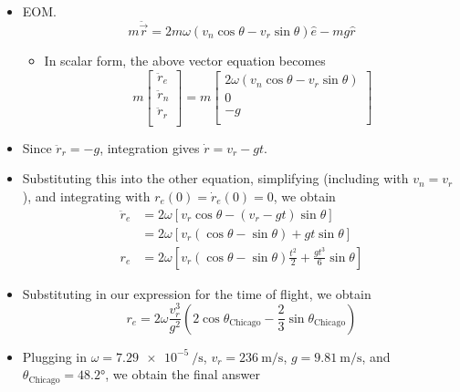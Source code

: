 \documentclass[../notes.tex]{subfiles}
\begin{document}
\begin{itemize}
\begin{itemize}
\begin{itemize}
        \end{itemize}
        \item EOM.
        \begin{equation*}
            m\ddot{\vec{r}} = 2m\omega(v_n\cos\theta-v_r\sin\theta)\hat{e}-mg\hat{r}
        \end{equation*}
        \begin{itemize}
            \item In scalar form, the above vector equation becomes
            \begin{equation*}
                m
                \begin{bmatrix}
                    \ddot{r}_e\\
                    \ddot{r}_n\\
                    \ddot{r}_r\\
                \end{bmatrix}
                = m
                \begin{bmatrix}
                    2\omega(v_n\cos\theta-v_r\sin\theta)\\
                    0\\
                    -g\\
                \end{bmatrix}
            \end{equation*}
        \end{itemize}
        \item Since $\ddot{r}_r=-g$, integration gives $\dot{r}=v_r-gt$.
        \item Substituting this into the other equation, simplifying (including with $v_n=v_r$), and integrating with $r_e(0)=\dot{r}_e(0)=0$, we obtain
        \begin{align*}
            \ddot{r}_e &= 2\omega[v_r\cos\theta-(v_r-gt)\sin\theta]\\
            &= 2\omega[v_r(\cos\theta-\sin\theta)+gt\sin\theta]\\
            r_e &= 2\omega\left[ v_r(\cos\theta-\sin\theta)\frac{t^2}{2}+\frac{gt^3}{6}\sin\theta \right]
        \end{align*}
        \item Substituting in our expression for the time of flight, we obtain
        \begin{equation*}
            r_e = 2\omega\frac{v_r^3}{g^2}\left( 2\cos\theta_\text{Chicago}-\frac{2}{3}\sin\theta_\text{Chicago} \right)
        \end{equation*}
        \item Plugging in $\omega=\SI{7.29e-5}{\per\second}$, $v_r=\SI[per-mode=symbol]{236}{\meter\per\second}$, $g=\SI[per-mode=symbol]{9.81}{\meter\per\second}$, and $\theta_\text{Chicago}=\ang{48.2}$, we obtain the final answer

\end{itemize}
\end{itemize}
\end{document}
